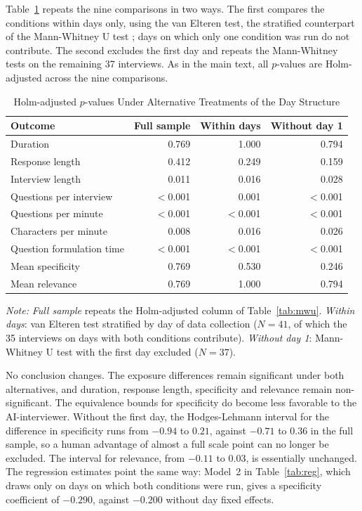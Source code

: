 \documentclass[12pt]{article}
\newcommand{\AII}{AI-interviewer}
\begin{document}
Table~\ref{tab:robust} repeats the nine comparisons in two ways. The first compares the conditions within days only, using the van Elteren test, the stratified counterpart of the Mann-Whitney U test \citep{vanElteren1960}; days on which only one condition was run do not contribute. The second excludes the first day and repeats the Mann-Whitney tests on the remaining 37 interviews. As in the main text, all $p$-values are Holm-adjusted across the nine comparisons.

\begin{table}[H]
\centering
\caption{Holm-adjusted $p$-values Under Alternative Treatments of the Day Structure}
\label{tab:robust}
\begin{tabularx}{\textwidth}{Xrrr}
\toprule
\textbf{Outcome} & \textbf{Full sample} & \textbf{Within days} &
  \textbf{Without day 1} \\
\midrule
Duration                  & 0.769    & 1.000    & 0.794    \\
Response length           & 0.412    & 0.249    & 0.159    \\
Interview length          & 0.011    & 0.016    & 0.028    \\
Questions per interview   & $<$0.001 & 0.001    & $<$0.001 \\
Questions per minute      & $<$0.001 & $<$0.001 & $<$0.001 \\
Characters per minute     & 0.008    & 0.016    & 0.026    \\
Question formulation time & $<$0.001 & $<$0.001 & $<$0.001 \\
Mean specificity          & 0.769    & 0.530    & 0.246    \\
Mean relevance            & 0.769    & 1.000    & 0.794    \\
\bottomrule
\end{tabularx}
\smallskip
\parbox{\textwidth}{\singlespacing\small \textit{Note:} \textit{Full sample} repeats the Holm-adjusted column of Table~\ref{tab:mwu}. \textit{Within days}: van Elteren test stratified by day of data collection ($N = 41$, of which the 35 interviews on days with both conditions contribute). \textit{Without day 1}: Mann-Whitney U test with the first day excluded ($N = 37$).}
\end{table}

No conclusion changes. The exposure differences remain significant under both alternatives, and duration, response length, specificity and relevance remain non-significant. The equivalence bounds for specificity do become less favorable to the \AII{}. Without the first day, the Hodges-Lehmann interval for the difference in specificity runs from $-0.94$ to $0.21$, against $-0.71$ to $0.36$ in the full sample, so a human advantage of almost a full scale point can no longer be excluded. The interval for relevance, from $-0.11$ to $0.03$, is essentially unchanged. The regression estimates point the same way: Model~2 in Table~\ref{tab:reg}, which draws only on days on which both conditions were run, gives a specificity coefficient of $-0.290$, against $-0.200$ without day fixed effects.
\end{document}
